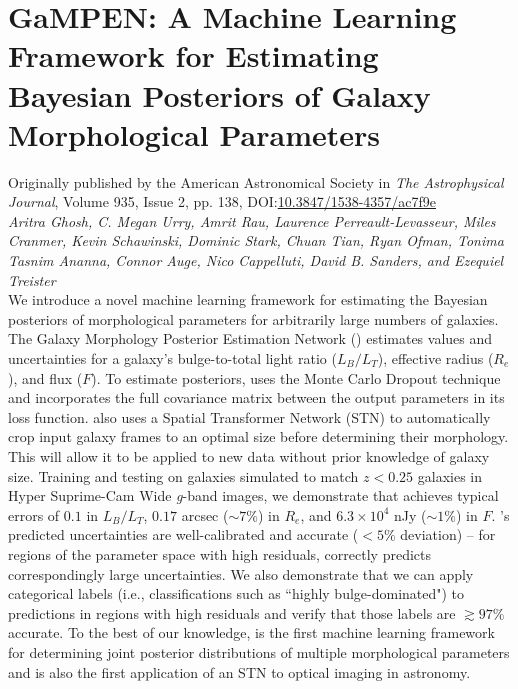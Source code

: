 \chapter{GaMPEN: A Machine Learning Framework for Estimating Bayesian Posteriors of Galaxy Morphological Parameters \label{ch:gampen}}

Originally published by the American Astronomical Society in \textit{The Astrophysical Journal}, Volume 935, Issue 2, pp. 138, DOI:\href{https://iopscience.iop.org/article/10.3847/1538-4357/ac7f9e}{10.3847/1538-4357/ac7f9e}\\
{\large \emph{Aritra Ghosh, C. Megan Urry, Amrit Rau, Laurence Perreault-Levasseur, Miles Cranmer, Kevin Schawinski, Dominic Stark, Chuan Tian, Ryan Ofman, Tonima Tasnim Ananna, Connor Auge, Nico Cappelluti, David B. Sanders, and Ezequiel Treister} }\\


We introduce a novel machine learning framework for estimating the Bayesian posteriors of morphological parameters for arbitrarily large numbers of galaxies.
The Galaxy Morphology Posterior Estimation Network (\gampen{}) 
estimates values and uncertainties for a galaxy's bulge-to-total light ratio ($L_B/L_T$), effective radius ($R_e$), and flux ($F$). To estimate posteriors, \gampen{} uses the Monte Carlo Dropout technique and incorporates the full covariance matrix between the output parameters in its loss function. %
\gampen{} also uses a Spatial Transformer Network (STN) to automatically crop input galaxy frames to an optimal size before determining their morphology. This will allow it to be applied to new data without prior knowledge of galaxy size.
Training and testing \gampen{} on galaxies simulated to match $z < 0.25$ galaxies in Hyper Suprime-Cam Wide \textit{g}-band images, we demonstrate that \gampen{} achieves typical errors of $0.1$ in $L_B/L_T$, $0.17$ arcsec ($\sim 7\%$) in $R_e$, and $6.3\times10^4$ nJy ($\sim 1\%$) in $F$. \gampen{}'s predicted uncertainties
are well-calibrated and accurate ($<5\%$ deviation) -- for regions of the parameter space with high residuals, \gampen{} correctly predicts correspondingly large uncertainties.
We also demonstrate that we can apply categorical labels (i.e., classifications such as ``highly bulge-dominated") to predictions in regions with high residuals and verify that those labels are  $\gtrsim 97\%$ accurate. To the best of our knowledge, \gampen{} is the first machine learning framework for determining joint posterior distributions of multiple morphological parameters and is also the first application of an STN to optical imaging in astronomy.


